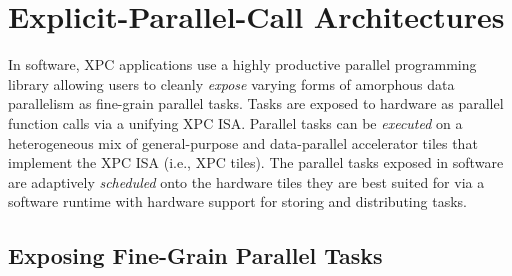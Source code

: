 
\section{Explicit-Parallel-Call Architectures}
\label{sec-xpc}

In software, XPC applications use a highly productive parallel
programming library allowing users to cleanly \emph{expose} varying forms
of amorphous data parallelism as fine-grain parallel tasks. Tasks are
exposed to hardware as parallel function calls via a unifying XPC
ISA. Parallel tasks can be \emph{executed} on a heterogeneous mix of
general-purpose and data-parallel accelerator tiles that implement the
XPC ISA (i.e., XPC tiles). The parallel tasks exposed in software are
adaptively \emph{scheduled} onto the hardware tiles they are best suited
for via a software runtime with hardware support for storing and
distributing tasks.

\subsection{Exposing Fine-Grain Parallel Tasks}


